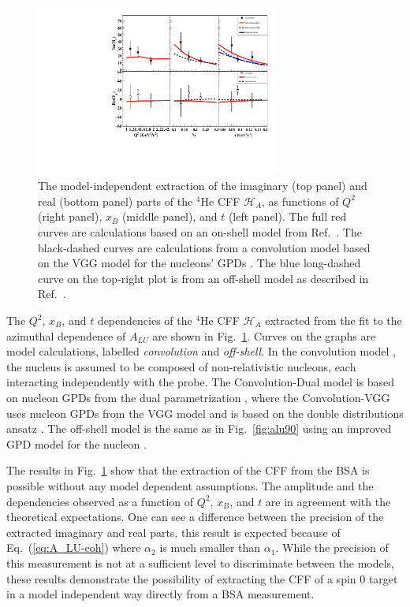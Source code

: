 \documentclass[twocolumn,nofootinbib,showpacs,prl,superscriptaddress,secnumarabic,amssymb,nobibnotes,aps,floatfix]{revtex4}
\begin{document}
\begin{figure}[tb]
\includegraphics[width=8cm]{figs/Coherent_CFF.pdf}
\caption{The model-independent extraction of the imaginary (top panel) and
real (bottom panel) parts of the $^4$He CFF $\mathcal{H}_A$, as functions of
$Q^{2}$ (right panel), $x_B$ (middle panel), and $t$ (left panel). The full red 
curves are calculations based on an on-shell model from Ref.~\cite{Vadim_priv}.
The black-dashed curves are calculations from a convolution 
model based on the VGG model for the nucleons' GPDs \cite{Guidal_priv}. The 
blue long-dashed curve on the top-right plot is from
an off-shell model as described in Ref.~\cite{GonzalezHernandez:2012jv}.}
\label{fig:CFF_HA}
\end{figure}

The $Q^2$, $x_B$, and $t$ dependencies of the $^4$He CFF $\mathcal{H}_A$ 
extracted from the fit to the azimuthal dependence of $A_{LU}$ are shown in 
Fig.~\ref{fig:CFF_HA}. Curves on the graphs are model calculations, labelled 
{\it convolution} and {\it off-shell}. In the convolution model 
\cite{Vadim_priv}, the nucleus is assumed to be composed of non-relativistic 
nucleons, each interacting independently with the probe. The Convolution-Dual 
model is based on nucleon GPDs from the dual parametrization 
\cite{Guzey:2006xi}, where the Convolution-VGG uses nucleon GPDs  from the VGG 
model and is based on the double distributions ansatz \cite{DD_model}. The 
off-shell model is the same as in Fig.~\ref{fig:alu90} using an improved
GPD model for the nucleon \cite{GonzalezHernandez:2012jv}.

The results in Fig.~\ref{fig:CFF_HA} show that the extraction of the CFF
from the BSA is possible without any model dependent 
assumptions. The amplitude and the dependencies observed as a function of 
$Q^{2}$, $x_B$, and $t$ are in agreement with the theoretical expectations. One 
can see a difference between the precision of the extracted imaginary and real 
parts, this result is expected because of Eq.~(\ref{eq:A_LU-coh}) where 
$\alpha_2$ is much smaller than $\alpha_1$. While the precision of this 
measurement is not at a sufficient level to discriminate between the models, 
these results demonstrate the possibility of extracting the CFF of a spin 0 
target in a model independent way directly from a BSA measurement.
\end{document}
